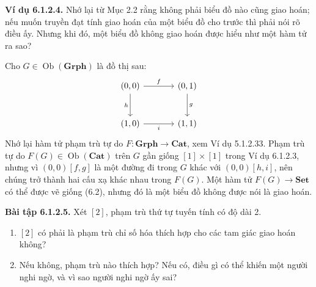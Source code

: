 \noindent\textbf{Ví dụ 6.1.2.4.} Nhớ lại từ Mục 2.2 rằng không phải biểu đồ nào cũng giao hoán; nếu muốn truyền đạt tính giao hoán của một biểu đồ cho trước thì phải nói rõ điều ấy. Nhưng khi đó, một biểu đồ không giao hoán được hiểu như một hàm tử ra sao?

Cho $G\in\operatorname{Ob}(\mathbf{Grph})$ là đồ thị sau:
\[\begin{tikzcd}[column sep=large,row sep=large](0,0)\arrow[r,"f"]\arrow[d,"h"']&(0,1)\arrow[d,"g"]\\(1,0)\arrow[r,"i"']&(1,1)\end{tikzcd}\]
Nhớ lại hàm tử phạm trù tự do $F:\mathbf{Grph}\to\mathbf{Cat}$, xem Ví dụ 5.1.2.33. Phạm trù tự do $F(G)\in\operatorname{Ob}(\mathbf{Cat})$ trên $G$ gần giống $[1]\times[1]$ trong Ví dụ 6.1.2.3, nhưng vì $(0,0)[f,g]$ là một đường đi trong $G$ khác với $(0,0)[h,i]$, nên chúng trở thành hai cấu xạ khác nhau trong $F(G)$. Một hàm tử $F(G)\to\mathbf{Set}$ có thể được vẽ giống (6.2), nhưng đó là một biểu đồ không được nói là giao hoán.

\noindent\textbf{Bài tập 6.1.2.5.} Xét $[2]$, phạm trù thứ tự tuyến tính có độ dài 2.
\begin{enumerate}[label=\alph*.]
\item $[2]$ có phải là phạm trù chỉ số hóa thích hợp cho các tam giác giao hoán không?
\item Nếu không, phạm trù nào thích hợp? Nếu có, điều gì có thể khiến một người nghi ngờ, và vì sao người nghi ngờ ấy sai?
\end{enumerate}
